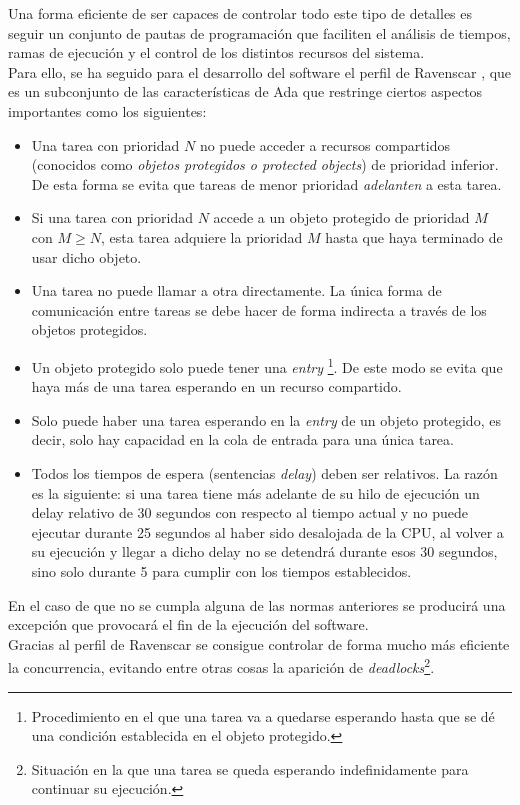 Una forma eficiente de ser capaces de controlar todo este tipo de detalles es
seguir un conjunto de pautas de programación que faciliten el análisis de
tiempos, ramas de ejecución y el control de los distintos recursos del sistema.
\\

Para ello, se ha seguido para el desarrollo del software el perfil de Ravenscar
\cite{perfil-ravenscar}, que es un subconjunto de las características de Ada
que restringe ciertos aspectos importantes como los siguientes:

\begin{itemize}
\item Una tarea con prioridad $N$ no puede acceder a recursos compartidos
  (conocidos como \textit{objetos protegidos o protected objects}) de prioridad
  inferior. De esta forma se evita que tareas de menor prioridad
  \textit{adelanten} a esta tarea.
\item Si una tarea con prioridad $N$ accede a un objeto protegido
  de prioridad $M$
  con $M \geq N$, esta tarea adquiere la prioridad $M$ hasta que haya
  terminado de usar dicho objeto.
\item Una tarea no puede llamar a otra directamente. La única forma de
  comunicación entre tareas se debe hacer de forma indirecta a través
  de los objetos protegidos.
\item Un objeto protegido solo puede tener una \textit{entry}
  \footnote{Procedimiento en el que una tarea va a quedarse esperando hasta que
    se dé una condición establecida en el objeto protegido.}. De este modo se
  evita que haya más de una tarea esperando en un recurso compartido.
\item Solo puede haber una tarea esperando en la \textit{entry} de un objeto
  protegido, es decir, solo hay capacidad en la cola de entrada para una única
  tarea.
\item Todos los tiempos de espera (sentencias \textit{delay}) deben ser
  relativos. La razón es la siguiente: si una tarea tiene más adelante de
  su hilo de ejecución un delay relativo
  de 30 segundos con respecto al tiempo actual y no puede ejecutar durante
  25 segundos al haber sido desalojada de la CPU, al volver a su ejecución
  y llegar a dicho delay no se detendrá durante esos 30 segundos, sino solo
  durante 5 para cumplir con los tiempos establecidos.
\end{itemize}

En el caso de que no se cumpla alguna de las normas anteriores se producirá
una excepción que provocará el fin de la ejecución del software.\\

Gracias al perfil de Ravenscar se consigue controlar de forma mucho más
eficiente la concurrencia, evitando entre otras cosas
la aparición de \textit{deadlocks}\footnote{Situación en la que una tarea
se queda esperando indefinidamente para continuar su ejecución.}.\\

